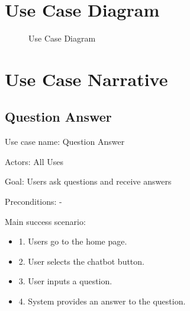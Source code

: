 \documentclass[12pt,oneside,openright,a4paper]{cpe-english-project}
\begin{document}
  \newpage
  \section{Use Case Diagram}
  \begin{figure}[!h]
    \centering
    \caption{Use Case Diagram}\label{fig:Use_Case}
  \end{figure}

  \section{Use Case Narrative}
    \subsection{Question Answer}
      \qquad Use case name: Question Answer \par
      \qquad Actors: All Uses \par
      \qquad Goal: Users ask questions and receive answers \par
      \qquad Preconditions: - \par
      \qquad Main success scenario:
      \begin{itemize}
        \item[] 1. Users go to the home page.
        \item[] 2. User selects the chatbot button.
        \item[] 3. User inputs a question.
        \item[] 4. System provides an answer to the question.
      \end{itemize}
\end{document}
